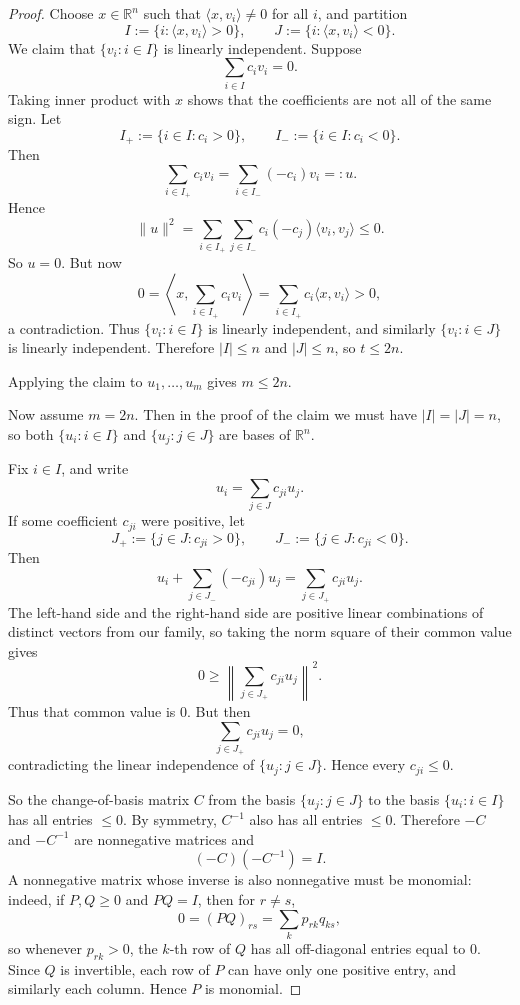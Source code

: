 \documentclass[11pt, a4paper]{ctexrep}
\begin{document}
\begin{proof}
    \smallskip
    Choose \(x\in\mathbb{R}^n\) such that \(\langle x,v_i\rangle\ne 0\) for all \(i\), and partition
    \[
        I:=\{i:\langle x,v_i\rangle>0\},
        \qquad
        J:=\{i:\langle x,v_i\rangle<0\}.
    \]
    We claim that \(\{v_i:i\in I\}\) is linearly independent. Suppose
    \[
        \sum_{i\in I} c_i v_i=0.
    \]
    Taking inner product with \(x\) shows that the coefficients are not all of the same sign. Let
    \[
        I_+:=\{i\in I:c_i>0\},
        \qquad
        I_-:=\{i\in I:c_i<0\}.
    \]
    Then
    \[
        \sum_{i\in I_+} c_i v_i
        =
        \sum_{i\in I_-} (-c_i)v_i
        =:u.
    \]
    Hence
    \[
        \|u\|^2
        =
        \sum_{i\in I_+}\sum_{j\in I_-} c_i(-c_j)\langle v_i,v_j\rangle
        \le 0.
    \]
    So \(u=0\). But now
    \[
        0=\left\langle x,\sum_{i\in I_+} c_i v_i\right\rangle
        =\sum_{i\in I_+} c_i\langle x,v_i\rangle>0,
    \]
    a contradiction. Thus \(\{v_i:i\in I\}\) is linearly independent, and similarly \(\{v_i:i\in J\}\)
    is linearly independent. Therefore \(|I|\le n\) and \(|J|\le n\), so \(t\le 2n\).

    \medskip
    Applying the claim to \(u_1,\dots,u_m\) gives \(m\le 2n\).

    Now assume \(m=2n\). Then in the proof of the claim we must have \(|I|=|J|=n\), so both
    \(\{u_i:i\in I\}\) and \(\{u_j:j\in J\}\) are bases of \(\mathbb{R}^n\).

    Fix \(i\in I\), and write
    \[
        u_i=\sum_{j\in J} c_{ji}u_j.
    \]
    If some coefficient \(c_{ji}\) were positive, let
    \[
        J_+:=\{j\in J:c_{ji}>0\},
        \qquad
        J_-:=\{j\in J:c_{ji}<0\}.
    \]
    Then
    \[
        u_i+\sum_{j\in J_-}(-c_{ji})u_j
        =
        \sum_{j\in J_+} c_{ji}u_j.
    \]
    The left-hand side and the right-hand side are positive linear combinations of distinct vectors from our
    family, so taking the norm square of their common value gives
    \[
        0\ge \left\| \sum_{j\in J_+} c_{ji}u_j \right\|^2.
    \]
    Thus that common value is \(0\). But then
    \[
        \sum_{j\in J_+} c_{ji}u_j=0,
    \]
    contradicting the linear independence of \(\{u_j:j\in J\}\). Hence every \(c_{ji}\le 0\).

    So the change-of-basis matrix \(C\) from the basis \(\{u_j:j\in J\}\) to the basis \(\{u_i:i\in I\}\)
    has all entries \(\le 0\). By symmetry, \(C^{-1}\) also has all entries \(\le 0\). Therefore
    \(-C\) and \(-C^{-1}\) are nonnegative matrices and
    \[
        (-C)(-C^{-1})=I.
    \]
    A nonnegative matrix whose inverse is also nonnegative must be monomial: indeed, if
    \(P,Q\ge 0\) and \(PQ=I\), then for \(r\ne s\),
    \[
        0=(PQ)_{rs}=\sum_k p_{rk}q_{ks},
    \]
    so whenever \(p_{rk}>0\), the \(k\)-th row of \(Q\) has all off-diagonal entries equal to \(0\).
    Since \(Q\) is invertible, each row of \(P\) can have only one positive entry, and similarly each column.
    Hence \(P\) is monomial.


\end{proof}
\end{document}
